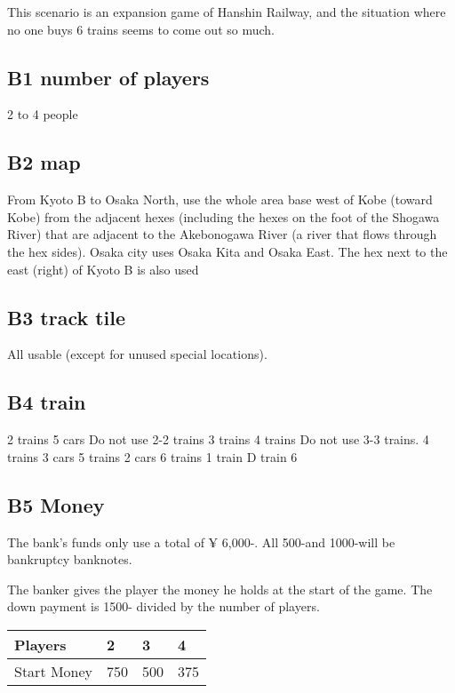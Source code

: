 \documentclass{article}
\begin{document}
\begin{CJK}{UTF8}{min}
This scenario is an expansion game of Hanshin Railway, and the
situation where no one buys 6 trains seems to come out so much.

\subsection*{B1 number of players}

2 to 4 people

\subsection*{B2 map}

From Kyoto B to Osaka North, use the whole area base west of Kobe
(toward Kobe) from the adjacent hexes (including the hexes on the foot
of the Shogawa River) that are adjacent to the Akebonogawa River (a
river that flows through the hex sides). Osaka city uses Osaka Kita
and Osaka East. The hex next to the east (right) of Kyoto B is also
used

\subsection*{B3 track tile}

All usable (except for unused special locations).

\subsection*{B4 train}

2 trains 5 cars
Do not use 2-2 trains
3 trains 4 trains
Do not use 3-3 trains.
4 trains 3 cars
5 trains 2 cars
6 trains 1 train
D train 6

\subsection*{B5 Money}

The bank's funds only use a total of ¥ 6,000-. All 500-and 1000-will
be bankruptcy banknotes.

The banker gives the player the money he holds at the start of the
game. The down payment is 1500- divided by the number of players.

\begin{tabular}{|l|l|l|l|}
\hline
Players & 2 & 3 & 4\\
\hline
Start Money & 750 & 500 & 375\\
\hline
\end{tabular}


\end{CJK}
\end{document}
